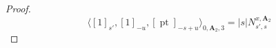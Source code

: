 \documentclass[12pt, oneside]{amsart}   	%
\newcommand{\vir}{\operatorname{vir}}
\newcommand{\pt}{\operatorname{pt}}
\newcommand{\ev}{\operatorname{ev}}
\numberwithin{equation}{section}
\numberwithin{thm}{section}
\numberwithin{figure}{section}
\begin{document}
\begin{proof}
\[\langle [1]_{s'},[1]_{-u},[\pt]_{-s+u}\rangle_{0,\textbf{A}_2,3} =  |s|N_{s',s}^{x,\textbf{A}_2}\]




\end{proof}
\end{document}
